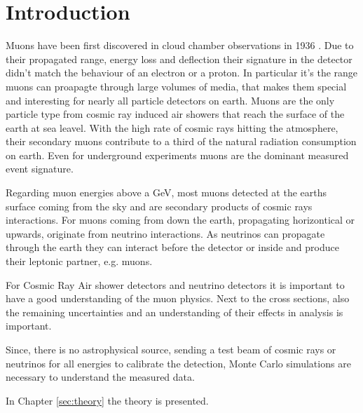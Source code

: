 \chapter{Introduction}

Muons have been first discovered in cloud chamber observations in 1936 \cite{Anderson36}.
Due to their propagated range, energy loss and deflection their signature in the detector didn't match the behaviour of an electron or a proton.
In particular it's the range muons can proapagte through large volumes of media, that makes them special and interesting for nearly all particle detectors on earth.
Muons are the only particle type from cosmic ray induced air showers that reach the surface of the earth at sea leavel.
With the high rate of cosmic rays hitting the atmosphere, their secondary muons contribute to a third of the natural radiation consumption on earth.
Even for underground experiments muons are the dominant measured event signature.

Regarding muon energies above a GeV, most muons detected at the earths surface coming from the sky and are secondary products of cosmic rays interactions.
For muons coming from down the earth, propagating horizontical or upwards, originate from neutrino interactions.
As neutrinos can propagate through the earth they can interact before the detector or inside and produce their leptonic partner, e.g. muons.

For Cosmic Ray Air shower detectors and neutrino detectors it is important to have a good understanding of the muon physics.
Next to the cross sections, also the remaining uncertainties and an understanding of their effects in analysis is important.

Since, there is no astrophysical source, sending a test beam of cosmic rays or neutrinos for all energies to calibrate the detection, Monte Carlo simulations are necessary to understand the measured data.

In Chapter \ref{sec:theory} the theory is presented.